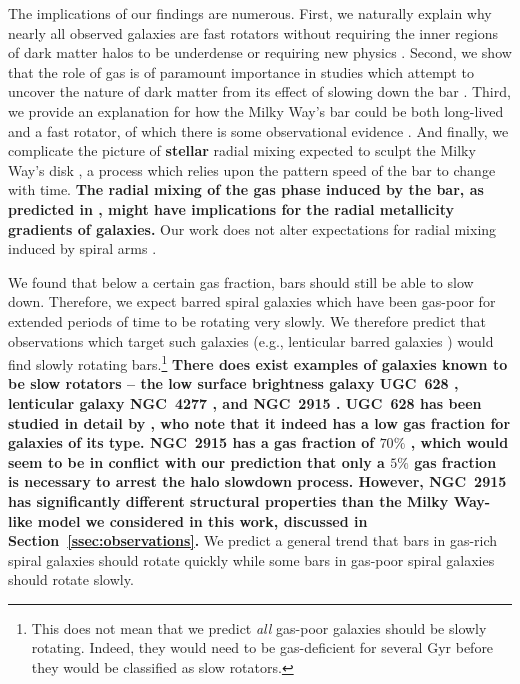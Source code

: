 \documentclass[twocolumn,linenumbers,trackchanges]{aastex631}
\begin{document}
The implications of our findings are numerous. First, we naturally explain why
nearly all observed galaxies are fast rotators without requiring the inner
regions of dark matter halos to be underdense \citep{1998ApJ...493L...5D,
2000ApJ...543..704D} or requiring new physics \citep{2021MNRAS.503.2833R,
2021MNRAS.508..926R}. Second, we show that the role of gas is of paramount
importance in studies which attempt to uncover the nature of dark matter from
its effect of slowing down the bar \citep{2021MNRAS.500.4710C,
2021MNRAS.505.2412C}. Third, we provide an explanation for how the Milky Way's
bar could be both long-lived and a fast rotator, of which there is some
observational evidence \citep{2019MNRAS.490.4740B}. And finally, we complicate
the picture of {\bf stellar} radial mixing expected to sculpt the Milky Way's
disk \citep{2012MNRAS.420..913B, 2015ApJ...808..132H}, a process which relies
upon the pattern speed of the bar to change with time. {\bf The radial mixing of
the gas phase induced by the bar, as predicted in \citet{2011MNRAS.415.1027H},
might have implications for the radial metallicity gradients of galaxies.} Our
work does not alter expectations for radial mixing induced by spiral arms
\citep{2002MNRAS.336..785S}.

We found that below a certain gas fraction, bars should still be able to slow
down. Therefore, we expect barred spiral galaxies which have been gas-poor for
extended periods of time to be rotating very slowly. We therefore predict that
observations which target such galaxies (e.g., lenticular barred galaxies
\citep{2009ARAA..47..159B}) would find slowly rotating bars.\footnote{This does
not mean that we predict \textit{all} gas-poor galaxies should be slowly
rotating. Indeed, they would need to be gas-deficient for several $\textrm{Gyr}$
before they would be classified as slow rotators.} {\bf There does exist
examples of galaxies known to be slow rotators -- the low surface brightness
galaxy UGC~628 \citep{2009AA...499L..25C}, lenticular galaxy NGC~4277
\citep{2022AA...664L..10B}, and NGC~2915 \citep{1999AJ....118.2158B}. UGC~628
has been studied in detail by \citet{2016MNRAS.463.1751C}, who note that it
indeed has a low gas fraction for galaxies of its type. NGC~2915 has a gas
fraction of $70\%$ \citep{2010ApJ...715..656W}, which would seem to be in
conflict with our prediction that only a $5\%$ gas fraction is necessary to
arrest the halo slowdown process. However, NGC~2915 has significantly different
structural properties than the Milky Way-like model we considered in this work,
discussed in Section~\ref{ssec:observations}.} We predict a general trend that
bars in gas-rich spiral galaxies should rotate quickly while some bars in
gas-poor spiral galaxies should rotate slowly.
\end{document}
